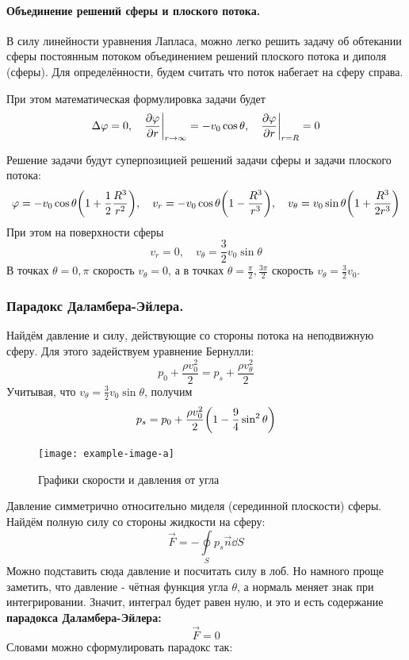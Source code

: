 \paragraph{Объединение решений сферы и плоского потока.} В силу линейности уравнения Лапласа, можно легко решить задачу об обтекании сферы постоянным потоком объединением решений плоского потока и диполя (сферы). Для определённости, будем считать что поток набегает на сферу справа. 

При этом математическая формулировка задачи будет
\begin{equation}
    \Delta \varphi = 0, \quad
    \pdv{\varphi}{r}\bigg|_{r\to \infty} = -v_0 \cos\theta, \quad
    \pdv{\varphi}{r}\bigg|_{r=R} = 0
\end{equation}

Решение задачи будут суперпозицией решений задачи сферы и задачи плоского потока:
\begin{equation}
    \varphi = -v_0 \cos\theta \qty(1+\frac{1}{2}\frac{R^3}{r^2}), \quad
    v_r = -v_0\cos\theta \qty(1-\frac{R^3}{r^3}), \quad
    v_\theta = v_0\sin\theta \qty(1+\frac{R^3}{2r^3})
\end{equation}
При этом на поверхности сферы
\begin{equation}
    v_r = 0, \quad
    v_\theta = \frac{3}{2}v_0\sin\theta
\end{equation}
В точках $\theta=0,\pi$ скорость $v_\theta=0$, а в точках $\theta=\frac{\pi}{2}, \frac{3\pi}{2}$ скорость $v_\theta=\frac{3}{2}v_0$.

\subsubsection{Парадокс Даламбера-Эйлера.} Найдём давление и силу, 
действующие со стороны потока на неподвижную сферу. Для этого задействуем
 уравнение Бернулли:
\begin{equation}
    p_0 + \frac{\rho v_0^2}{2} = 
    p_s + \frac{\rho v_\theta^2}{2}
\end{equation}
Учитывая, что $v_\theta=\frac{3}{2}v_0\sin\theta$, получим
\begin{equation}
    p_s = p_0 + \frac{\rho v_0^2}{2}\qty(1-\frac{9}{4}\sin^2\theta)
\end{equation}
\begin{figure}[H]
    \centering
    \texttt{[image: example-image-a]}
    \caption{Графики скорости и давления от угла}
    \label{fig:pandv}
\end{figure}
Давление симметрично относительно миделя (серединной плоскости) сферы. Найдём полную силу со стороны жидкости на сферу:
\begin{equation}
    \vec{F} = - \oint\limits_S p_s \vec{n} \dd{S}
\end{equation}
Можно подставить сюда давление и посчитать силу в лоб. Но намного проще
 заметить, что давление - чётная функция угла $\theta$, а нормаль 
 меняет знак при интегрировании. Значит, интеграл будет равен нулю, и
 это и есть содержание \textbf{парадокса Даламбера-Эйлера:}
 \begin{equation}
     \vec{F}=0
 \end{equation}
Словами можно сформулировать парадокс так:

